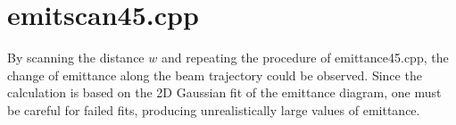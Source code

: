\documentclass{article}
\begin{document}
\section{emitscan45.cpp}
By scanning the distance $w$ and repeating the procedure of emittance45.cpp, the change of emittance along the beam trajectory could be observed. Since the calculation is based on the 2D Gaussian fit of the emittance diagram, one must be careful for failed fits, producing unrealistically large values of emittance.
\end{document}
